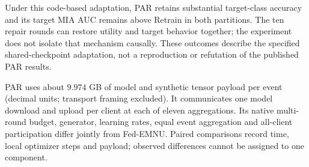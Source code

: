 Under this code-based adaptation, PAR retains substantial target-class accuracy and its target MIA AUC remains above Retrain in both partitions. The ten repair rounds can restore utility and target behavior together; the experiment does not isolate that mechanism causally. These outcomes describe the specified shared-checkpoint adaptation, not a reproduction or refutation of the published PAR results.

PAR uses about $9.974$ GB of model and synthetic tensor payload per event (decimal units; transport framing excluded). It communicates one model download and upload per client at each of eleven aggregations. Its native multi-round budget, generator, learning rates, equal event aggregation and all-client participation differ jointly from Fed-EMNU. Paired comparisons record time, local optimizer steps and payload; observed differences cannot be assigned to one component.

